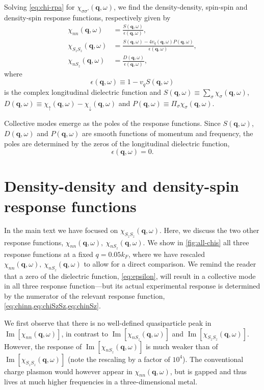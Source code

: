 \documentclass[aps,prb,reprint,twocolumns,superscriptaddress,nofootinbib]{revtex4-2}
\DeclareMathOperator{\Imm}{Im}
\newcommand{\kF}{k_{F}}
\begin{document}
	
	Solving \cref{eq:chi-rpa} for $\chi_{\sigma\sigma'}(\bm q,\omega)$, we find the density-density, spin-spin and density-spin response functions, respectively given by
	\begin{align}
		\chi_{nn}(\bm q,\omega) &= \frac{S(\bm q,\omega)}{\epsilon(\bm q,\omega)}, \label{eq:chinn}\\
		\chi_{S_zS_z}(\bm q,\omega)&=\frac{S(\bm q,\omega)-4v_q(\bm q,\omega)P(\bm q,\omega)}{\epsilon(\bm q,\omega)} ,\label{eq:chiSzSz}\\
		\chi_{nS_z}(\bm q,\omega)&=\frac{D(\bm q,\omega)}{\epsilon(\bm q,\omega)} ,\label{eq:chinSz}
	\end{align}
	where 
	\begin{equation}
		\epsilon(\bm q,\omega) \equiv 1 - v_qS(\bm q,\omega) \label{eq:epsilon}
	\end{equation}
	is the complex longitudinal dielectric function and $S(\bm q,\omega)\equiv\sum_\sigma \chi_\sigma (\bm q,\omega)$, $D(\bm q,\omega)\equiv\chi_\uparrow (\bm q,\omega)-\chi_\downarrow (\bm q,\omega)$ and $P(\bm q,\omega)\equiv\Pi_\sigma \chi_\sigma (\bm q,\omega)$. 
	
	Collective modes emerge as the poles of the response functions. Since $S(\bm q,\omega)$, $D(\bm q,\omega)$ and $P(\bm q,\omega)$ are smooth functions of momentum and frequency, the poles are determined by the zeros of the longitudinal dielectric function, 
	\begin{equation}
		\epsilon(\bm q,\omega) = 0. \label{eq:poles}
	\end{equation}
	\section{Density-density and density-spin response functions} 
	In the main text we have focused on $\chi_{S_zS_z}(\bm q,\omega)$. Here, we discuss the two other response functions, $\chi_{nn}(\bm q,\omega),\ \chi_{nS_z}(\bm q,\omega)$.	
	We show in \cref{fig:all-chis} all three response functions at a fixed $q=0.05\kF$, where we have rescaled $\chi_{nn}(\bm q,\omega),\ \chi_{nS_z}(\bm q,\omega)$ to allow for a direct comparison. We remind the reader that a zero of the dielectric function, \cref{eq:epsilon}, will result in a collective mode in all three response function---but its actual experimental response is determined by the numerator of the relevant response function, \cref{eq:chinn,eq:chiSzSz,eq:chinSz}. 
	
	We first observe that there is no well-defined quasiparticle peak in $\Imm[\chi_{nn}(\bm q,\omega)]$, in contrast to $\Imm[\chi_{nS_z}(\bm q,\omega)]$ and $\Imm[\chi_{S_zS_z}(\bm q,\omega)]$. However, the response of $\Imm[\chi_{nS_z}(\bm q,\omega)]$ is much weaker than of $\Imm[\chi_{S_zS_z}(\bm q,\omega)]$ (note the rescaling by a factor of $10^4$). 	
	The conventional charge plasmon would however appear in $\chi_{nn}(\bm q,\omega)$, but is gapped and thus lives at much higher frequencies in a three-dimensional metal.
	
\end{document}
